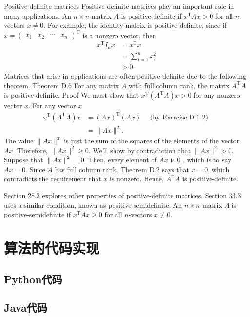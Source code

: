 \documentclass[lang=cn,newtx,10pt,scheme=chinese]{elegantbook}
\begin{document}
Positive-definite matrices
Positive-definite matrices play an important role in many applications. An $n \times n$ matrix $A$ is positive-definite if $x^{\mathrm{T}} A x>0$ for all $n$-vectors $x \neq 0$. For example, the identity matrix is positive-definite, since if $x=\left(\begin{array}{llll}x_1 & x_2 & \cdots & x_n\end{array}\right)^{\mathrm{T}}$ is a nonzero vector, then
$$
\begin{aligned}
x^{\mathrm{T}} I_n x & =x^{\mathrm{T}} x \\
& =\sum_{i=1}^n x_i^2 \\
& >0 .
\end{aligned}
$$
Matrices that arise in applications are often positive-definite due to the following theorem.
Theorem D.6
For any matrix $A$ with full column rank, the matrix $A^{\mathrm{T}} A$ is positive-definite.
Proof We must show that $x^{\mathrm{T}}\left(A^{\mathrm{T}} A\right) x>0$ for any nonzero vector $x$. For any vector $x$
$$
\begin{aligned}
x^{\mathrm{T}}\left(A^{\mathrm{T}} A\right) x & =(A x)^{\mathrm{T}}(A x) \quad \text { (by Exercise D.1-2) } \\
& =\|A x\|^2 .
\end{aligned}
$$
The value $\|A x\|^2$ is just the sum of the squares of the elements of the vector $A x$. Therefore, $\|A x\|^2 \geq 0$. We'll show by contradiction that $\|A x\|^2>0$. Suppose that $\|A x\|^2=0$. Then, every element of $A x$ is 0 , which is to say $A x=0$. Since $A$ has full column rank, Theorem D.2 says that $x=0$, which contradicts the requirement that $x$ is nonzero. Hence, $A^{\mathrm{T}} A$ is positive-definite.

Section 28.3 explores other properties of positive-definite matrices. Section 33.3 uses a similar condition, known as positive-semidefinite. An $n \times n$ matrix $A$ is positive-semidefinite if $x^{\mathrm{T}} A x \geq 0$ for all $n$-vectors $x \neq 0$.

\part{算法的代码实现}

\chapter{Python代码}

\chapter{Java代码}
\end{document}
